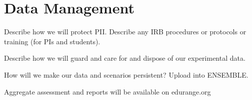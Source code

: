 \section*{Data Management}

Describe how we will protect PII. Describe any IRB procedures or
protocols or training (for PIs and students).

Describe how we will guard and care for and dispose of our
experimental data.

How will we make our data and scenarios persistent? Upload into
ENSEMBLE.

Aggregate assessment and reports will be available on edurange.org



